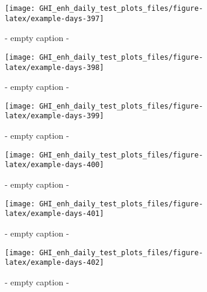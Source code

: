 \documentclass[
  10pt,
  a4paper,oneside]{article}
\begin{document}
\begin{figure}[H]

{\centering \texttt{[image: GHI\_enh\_daily\_test\_plots\_files/figure-latex/example-days-397]} 

}

\caption{ - empty caption - }\label{fig:example-days-397}
\end{figure}

\begin{figure}[H]

{\centering \texttt{[image: GHI\_enh\_daily\_test\_plots\_files/figure-latex/example-days-398]} 

}

\caption{ - empty caption - }\label{fig:example-days-398}
\end{figure}

\begin{figure}[H]

{\centering \texttt{[image: GHI\_enh\_daily\_test\_plots\_files/figure-latex/example-days-399]} 

}

\caption{ - empty caption - }\label{fig:example-days-399}
\end{figure}

\begin{figure}[H]

{\centering \texttt{[image: GHI\_enh\_daily\_test\_plots\_files/figure-latex/example-days-400]} 

}

\caption{ - empty caption - }\label{fig:example-days-400}
\end{figure}

\begin{figure}[H]

{\centering \texttt{[image: GHI\_enh\_daily\_test\_plots\_files/figure-latex/example-days-401]} 

}

\caption{ - empty caption - }\label{fig:example-days-401}
\end{figure}

\begin{figure}[H]

{\centering \texttt{[image: GHI\_enh\_daily\_test\_plots\_files/figure-latex/example-days-402]} 

}

\caption{ - empty caption - }\label{fig:example-days-402}
\end{figure}
\end{document}
